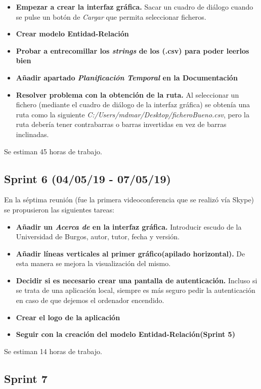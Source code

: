 \begin{itemize}
\item
\textbf{Empezar a crear la interfaz gráfica.} Sacar un cuadro de diálogo cuando se pulse un botón de \emph{Cargar} que permita seleccionar ficheros.
\item
\textbf{Crear modelo Entidad-Relación}
\item
\textbf{Probar a entrecomillar los \emph{strings} de los (.csv) para poder leerlos bien}
\item
\textbf{Añadir apartado \emph{Planificación Temporal} en la Documentación}
\item
\textbf{Resolver problema con la obtención de la ruta.} Al seleccionar un fichero (mediante el cuadro de diálogo de la interfaz gráfica) se obtenía una ruta como la siguiente \emph{C:/Users/mdmar/Desktop/ficheroBueno.csv}, pero la ruta debería tener contrabarras o barras invertidas en vez de barras inclinadas.
\end{itemize}

Se estiman 45 horas de trabajo.

\subsection{Sprint 6 (04/05/19 - 07/05/19)}
En la séptima reunión (fue la primera videoconferencia que se realizó vía Skype) se propusieron las siguientes tareas:

\begin{itemize}
\item
\textbf{Añadir un \emph{Acerca de} en la interfaz gráfica.} Introducir escudo de la Universidad de Burgos, autor, tutor, fecha y versión.
\item
\textbf{Añadir líneas verticales al primer gráfico(apilado horizontal).} De esta manera se mejora la visualización del mismo.
\item
\textbf{Decidir si es necesario crear una pantalla de autenticación.} Incluso si se trata de una aplicación local, siempre es más seguro pedir la autenticación en caso de que dejemos el ordenador encendido.
\item
\textbf{Crear el logo de la aplicación} 
\item
\textbf{Seguir con la creación del modelo Entidad-Relación(Sprint 5)}
\end{itemize}

Se estiman 14 horas de trabajo.

\subsection{Sprint 7}


